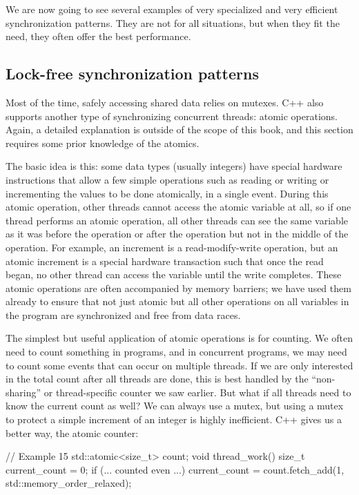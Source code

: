We are now going to see several examples of very specialized and very efficient synchronization patterns. They are not for all situations, but when they fit the need, they often offer the best performance.

\subsection{Lock-free synchronization patterns}

Most of the time, safely accessing shared data relies on mutexes. C++ also supports another type of synchronizing concurrent threads: atomic operations. Again, a detailed explanation is outside of the scope of this book, and this section requires some prior knowledge of the atomics.

The basic idea is this: some data types (usually integers) have special hardware instructions that allow a few simple operations such as reading or writing or incrementing the values to be done atomically, in a single event. During this atomic operation, other threads cannot access the atomic variable at all, so if one thread performs an atomic operation, all other threads can see the same variable as it was before the operation or after the operation but not in the middle of the operation. For example, an increment is a read-modify-write operation, but an atomic increment is a special hardware transaction such that once the read began, no other thread can access the variable until the write completes. These atomic operations are often accompanied by memory barriers; we have used them already to ensure that not just atomic but all other operations on all variables in the program are synchronized and free from data races.

The simplest but useful application of atomic operations is for counting. We often need to count something in programs, and in concurrent programs, we may need to count some events that can occur on multiple threads. If we are only interested in the total count after all threads are done, this is best handled by the ``non-sharing'' or thread-specific counter we saw earlier. But what if all threads need to know the current count as well? We can always use a mutex, but using a mutex to protect a simple increment of an integer is highly inefficient. C++ gives us a better way, the atomic counter:

\begin{code}
// Example 15
std::atomic<size_t> count;
void thread_work() {
  size_t current_count = 0;
  if (... counted even ...) {
    current_count =
      count.fetch_add(1, std::memory_order_relaxed);
  }
}
\end{code}

